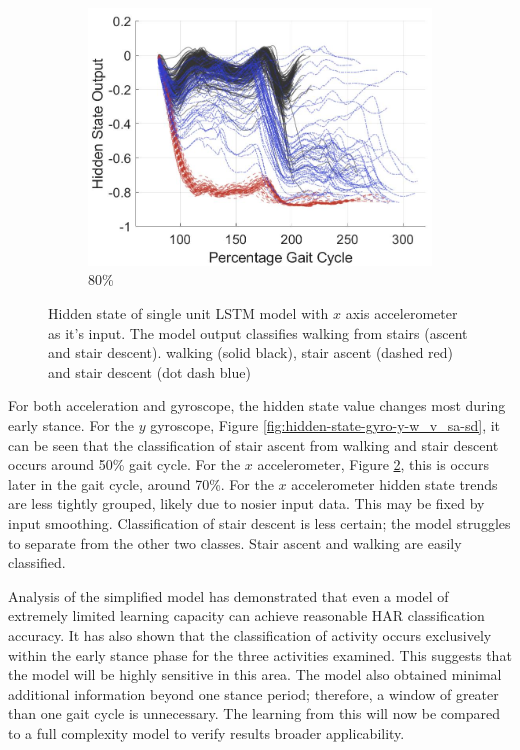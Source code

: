 \documentclass[sensors,article,submit,moreauthors,pdftex]{Definitions/mdpi}
\begin{document}
\begin{figure}[!hbt]
     \begin{subfigure}[b]{0.32\textwidth}
         \centering
         \includegraphics[width=\textwidth]{Figures/results/hidden_state/accel_x_w_v_sa-sd/80_Participant_04.jpg}
         \caption{80\%}
         \label{subfig:e}
     \end{subfigure}
    \caption{Hidden state of single unit LSTM model with $x$ axis accelerometer as it's input. The model output classifies walking from stairs (ascent and stair descent). walking (solid black), stair ascent (dashed red) and stair descent (dot dash blue)}
    \label{fig:hidden-state-accel-x-w_v_sa-sd}
\end{figure}

For both acceleration and gyroscope, the hidden state value changes most during early stance. For the $y$ gyroscope, Figure \ref{fig:hidden-state-gyro-y-w_v_sa-sd}, it can be seen that the classification of stair ascent from walking and stair descent occurs around 50\% gait cycle. For the $x$ accelerometer, Figure \ref{fig:hidden-state-accel-x-w_v_sa-sd}, this is occurs later in the gait cycle, around 70\%. For the $x$ accelerometer hidden state trends are less tightly grouped, likely due to nosier input data. This may be fixed by input smoothing. Classification of stair descent is less certain; the model struggles to separate from the other two classes. Stair ascent and walking are easily classified.

Analysis of the simplified model has demonstrated that even a model of extremely limited learning capacity can achieve reasonable HAR classification accuracy. It has also shown that the classification of activity occurs exclusively within the early stance phase for the three activities examined. This suggests that the model will be highly sensitive in this area. The model also obtained minimal additional information beyond one stance period; therefore, a window of greater than one gait cycle is unnecessary. The learning from this will now be compared to a full complexity model to verify results broader applicability.
\end{document}
